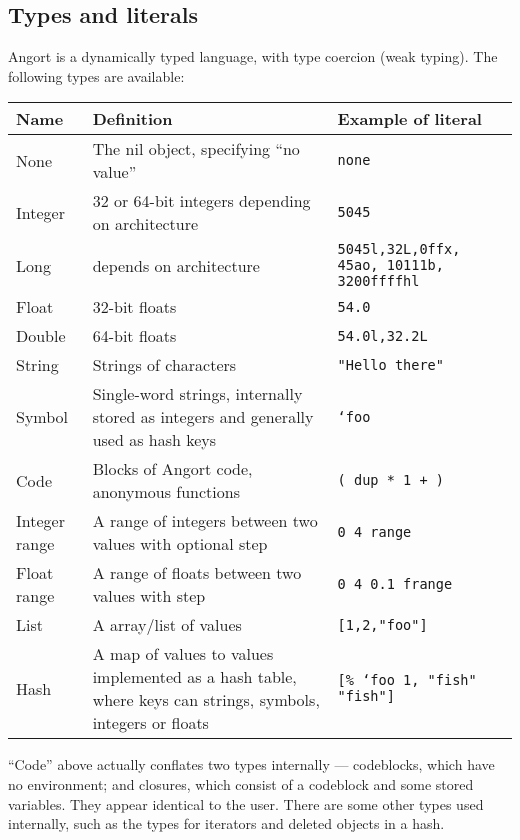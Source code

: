 \subsection{Types and literals}
Angort is a dynamically typed language, with type coercion (weak typing).
The following types are available:
\indw{[}\indw{]}
\begin{center}
\begin{tabular}{|l|p{2.7in}|p{2in}|}\hline
\textbf{Name} & \textbf{Definition} & \textbf{Example of literal} \\ \hline
None & The nil object, specifying ``no value'' & \texttt{none} \\
Integer & 32 or 64-bit integers depending on architecture & \texttt{5045} \\
Long & depends on architecture & \texttt{5045l,32L,0ffx, 45ao, 10111b, 3200ffffhl} \\
Float & 32-bit floats & \texttt{54.0} \\
Double & 64-bit floats & \texttt{54.0l,32.2L} \\
String & Strings of characters & \texttt{"Hello there"} \\
Symbol & Single-word strings, internally stored as integers and
generally used as hash keys & \texttt{`foo} \\
Code& Blocks of Angort code, anonymous functions & \texttt{( dup * 1 + )}\\
Integer range & 
A range of integers between two values with optional step &
\texttt{0 4 range}\footnotemark[1]\\
Float range & A range of floats between two values with 
step& \texttt{0 4 0.1 frange}\\
List & A array/list of values\footnotemark[2] & \texttt{[1,2,"foo"]} \\
Hash & A map of values to values implemented as a hash table, where
keys can strings, symbols, integers or floats & \texttt{[\% `foo 1, "fish" "fish"]} \\
\hline
\end{tabular}
\end{center}
``Code'' above actually conflates two types internally --- codeblocks,
which have no environment; and closures, which consist of a codeblock and
some stored variables. They appear identical to the user.
There are some other types used internally, such as the
types for iterators and deleted objects in a hash.


